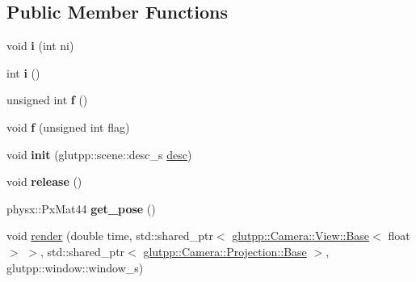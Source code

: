 \subsection*{\-Public \-Member \-Functions}
\begin{DoxyCompactItemize}
\item 
\hypertarget{classglutpp_1_1scene_1_1scene_abe1fa6d1512bfd84e91f9192e7c743ca}{void {\bfseries i} (int ni)}\label{classglutpp_1_1scene_1_1scene_abe1fa6d1512bfd84e91f9192e7c743ca}

\item 
\hypertarget{classglutpp_1_1scene_1_1scene_abbc88704970f055844e5f06453178dcb}{int {\bfseries i} ()}\label{classglutpp_1_1scene_1_1scene_abbc88704970f055844e5f06453178dcb}

\item 
\hypertarget{classglutpp_1_1scene_1_1scene_acb8ef22577d6d70aef89faf02c671d77}{unsigned int {\bfseries f} ()}\label{classglutpp_1_1scene_1_1scene_acb8ef22577d6d70aef89faf02c671d77}

\item 
\hypertarget{classglutpp_1_1scene_1_1scene_a25b3ffec412aa55a88d4c4fb6a1c7a3b}{void {\bfseries f} (unsigned int flag)}\label{classglutpp_1_1scene_1_1scene_a25b3ffec412aa55a88d4c4fb6a1c7a3b}

\item 
\hypertarget{classglutpp_1_1scene_1_1scene_ac204eb31618e2fd30c962c49e3767e25}{void {\bfseries init} (glutpp\-::scene\-::desc\-\_\-s \hyperlink{classglutpp_1_1scene_1_1desc}{desc})}\label{classglutpp_1_1scene_1_1scene_ac204eb31618e2fd30c962c49e3767e25}

\item 
\hypertarget{classglutpp_1_1scene_1_1scene_a5de02f6d7763af6ad7b5fb8e57499a65}{void {\bfseries release} ()}\label{classglutpp_1_1scene_1_1scene_a5de02f6d7763af6ad7b5fb8e57499a65}

\item 
\hypertarget{classglutpp_1_1scene_1_1scene_ac14e8f1e177017420a5ef773a42f3b97}{physx\-::\-Px\-Mat44 {\bfseries get\-\_\-pose} ()}\label{classglutpp_1_1scene_1_1scene_ac14e8f1e177017420a5ef773a42f3b97}

\item 
\hypertarget{classglutpp_1_1scene_1_1scene_a62e8789911000041f65647f1513edc7e}{void \hyperlink{classglutpp_1_1scene_1_1scene_a62e8789911000041f65647f1513edc7e}{render} (double time, std\-::shared\-\_\-ptr$<$ \hyperlink{classglutpp_1_1Camera_1_1View_1_1Base}{glutpp\-::\-Camera\-::\-View\-::\-Base}$<$ float $>$ $>$, std\-::shared\-\_\-ptr$<$ \hyperlink{classglutpp_1_1Camera_1_1Projection_1_1Base}{glutpp\-::\-Camera\-::\-Projection\-::\-Base} $>$, glutpp\-::window\-::window\-\_\-s)}\label{classglutpp_1_1scene_1_1scene_a62e8789911000041f65647f1513edc7e}


\end{DoxyCompactItemize}
